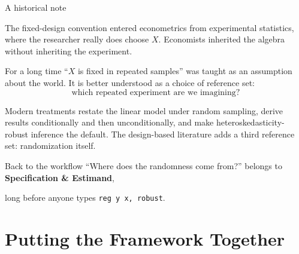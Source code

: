 \documentclass[aspectratio=169,11pt]{beamer}
\newcommand{\Spec}{\textcolor{DeepBlue}{\textbf{Specification \& Estimand}}}
\begin{document}
\begin{frame}{A historical note}

The fixed-design convention entered econometrics from experimental statistics,
where the researcher really does choose $X$. Economists inherited the algebra
without inheriting the experiment.

\vspace{0.3em}

For a long time ``$X$ is fixed in repeated samples'' was taught as an assumption
about the world. It is better understood as a choice of reference set:
\[
\boxed{\text{which repeated experiment are we imagining?}}
\]

\vspace{0.3em}

Modern treatments restate the linear model under random sampling, derive results
conditionally and then unconditionally, and make heteroskedasticity-robust
inference the default. The design-based literature adds a third reference set:
randomization itself.

\vspace{0.35em}

\begin{block}{Back to the workflow}
``Where does the randomness come from?'' belongs to \Spec,

long before anyone types \texttt{reg y x, robust}.
\end{block}

\end{frame}

\section{Putting the Framework Together}
\end{document}
